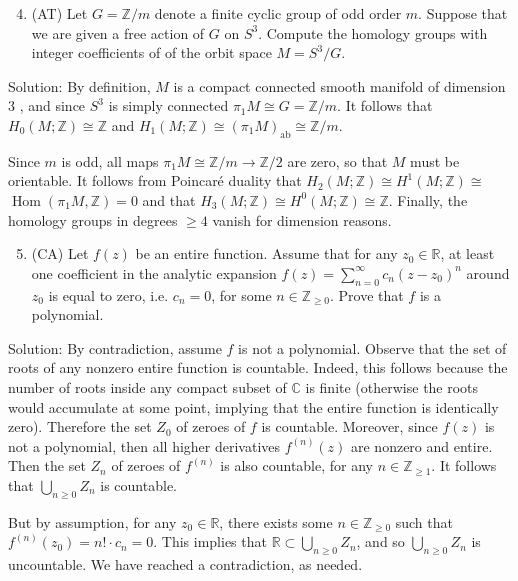 \documentclass[10pt]{article}
\begin{document}
\begin{enumerate}
  \setcounter{enumi}{3}
  \item (AT) Let $G=\mathbb{Z} / m$ denote a finite cyclic group of odd order $m$. Suppose that we are given a free action of $G$ on $S^{3}$. Compute the homology groups with integer coefficients of of the orbit space $M=S^{3} / G$.
\end{enumerate}

Solution: By definition, $M$ is a compact connected smooth manifold of dimension 3 , and since $S^{3}$ is simply connected $\pi_{1} M \cong G=\mathbb{Z} / m$. It follows that $H_{0}(M ; \mathbb{Z}) \cong \mathbb{Z}$ and $H_{1}(M ; \mathbb{Z}) \cong\left(\pi_{1} M\right)_{\mathrm{ab}} \cong \mathbb{Z} / m$.

Since $m$ is odd, all maps $\pi_{1} M \cong \mathbb{Z} / m \rightarrow \mathbb{Z} / 2$ are zero, so that $M$ must be orientable. It follows from Poincaré duality that $H_{2}(M ; \mathbb{Z}) \cong H^{1}(M ; \mathbb{Z}) \cong$ $\operatorname{Hom}\left(\pi_{1} M, \mathbb{Z}\right)=0$ and that $H_{3}(M ; \mathbb{Z}) \cong H^{0}(M ; \mathbb{Z}) \cong \mathbb{Z}$. Finally, the homology groups in degrees $\geq 4$ vanish for dimension reasons.

\begin{enumerate}
  \setcounter{enumi}{4}
  \item (CA) Let $f(z)$ be an entire function. Assume that for any $z_{0} \in \mathbb{R}$, at least one coefficient in the analytic expansion $f(z)=\sum_{n=0}^{\infty} c_{n}\left(z-z_{0}\right)^{n}$ around $z_{0}$ is equal to zero, i.e. $c_{n}=0$, for some $n \in \mathbb{Z}_{\geq 0}$. Prove that $f$ is a polynomial.
\end{enumerate}

Solution: By contradiction, assume $f$ is not a polynomial. Observe that the set of roots of any nonzero entire function is countable. Indeed, this follows because the number of roots inside any compact subset of $\mathbb{C}$ is finite (otherwise the roots would accumulate at some point, implying that the entire function is identically zero). Therefore the set $Z_{0}$ of zeroes of $f$ is countable. Moreover, since $f(z)$ is not a polynomial, then all higher derivatives $f^{(n)}(z)$ are nonzero and entire. Then the set $Z_{n}$ of zeroes of $f^{(n)}$ is also countable, for any $n \in \mathbb{Z}_{\geq 1}$. It follows that $\bigcup_{n \geq 0} Z_{n}$ is countable.

But by assumption, for any $z_{0} \in \mathbb{R}$, there exists some $n \in \mathbb{Z}_{\geq 0}$ such that $f^{(n)}\left(z_{0}\right)=n ! \cdot c_{n}=0$. This implies that $\mathbb{R} \subset \bigcup_{n \geq 0} Z_{n}$, and so $\bigcup_{n \geq 0} Z_{n}$ is uncountable. We have reached a contradiction, as needed.
\end{document}
